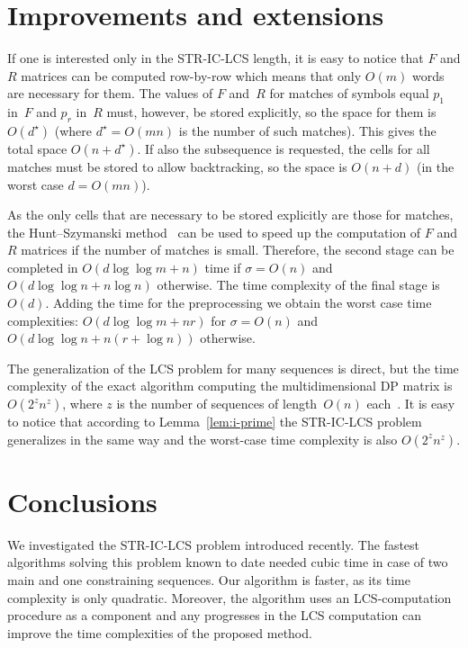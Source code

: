 \documentclass[12pt]{article}
\begin{document}
\section{Improvements and extensions}
\label{sec:impr}
If one is interested only in the STR-IC-LCS length, it is easy to notice that $F$ and $R$ matrices can be computed row-by-row which means that only $O(m)$ words are necessary for them.
The values of $F$ and~$R$ for matches of symbols equal $p_1$ in~$F$ and $p_r$ in~$R$ must, however, be stored explicitly, so the space for them is $O(d^\star)$ (where $d^\star = O(mn)$ is the number of such matches).
This gives the total space $O(n+d^\star)$.
If also the subsequence is requested, the cells for all matches must be stored to allow backtracking, so the space is $O(n+d)$ (in the worst case $d = O(mn)$).


As the only cells that are necessary to be stored explicitly are those for matches, the Hunt--Szymanski method~\cite{Gus1997} can be used to speed up the computation of $F$ and $R$ matrices if the number of matches is small.
Therefore, the second stage can be completed in $O(d\log\log m + n)$ time if $\sigma = O(n)$ and $O(d\log\log n + n\log n)$ otherwise.
The time complexity of the final stage is~$O(d)$.
Adding the time for the preprocessing we obtain the worst case time complexities:
$O(d\log\log m + nr)$ for $\sigma = O(n)$ and $O(d\log\log n + n(r+\log n))$ otherwise.


The generalization of the LCS problem for many sequences is direct, but the time complexity of the exact algorithm computing the multidimensional DP matrix is $O(2^z n^z)$, where $z$ is the number of sequences of length~$O(n)$ each~\cite{Gus1997}.
It is easy to notice that according to Lemma~\ref{lem:i-prime} the STR-IC-LCS problem generalizes in the same way and the worst-case time complexity is also $O(2^z n^z)$.


\section{Conclusions}
\label{sec:concs}
We investigated the STR-IC-LCS problem introduced recently.
The fastest algorithms solving this problem known to date needed cubic time in case of two main and one constraining sequences.
Our algorithm is faster, as its time complexity is only quadratic.
Moreover, the algorithm uses an LCS-computation procedure as a component and any progresses in the LCS computation can improve the time complexities of the proposed method.
\end{document}
